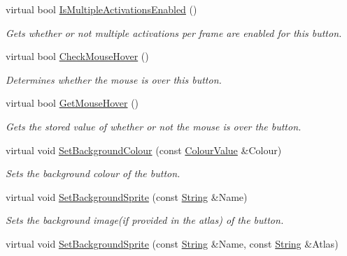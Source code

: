 \begin{DoxyCompactItemize}
virtual bool \hyperlink{classphys_1_1UI_1_1Button_a6630a0e94a3998f6972b35a4e368b3ff}{IsMultipleActivationsEnabled} ()
\begin{DoxyCompactList}\small\item\em Gets whether or not multiple activations per frame are enabled for this button. \item\end{DoxyCompactList}\item 
virtual bool \hyperlink{classphys_1_1UI_1_1Button_a72d76501d15053e3fbd9e7eb933e22de}{CheckMouseHover} ()
\begin{DoxyCompactList}\small\item\em Determines whether the mouse is over this button. \item\end{DoxyCompactList}\item 
virtual bool \hyperlink{classphys_1_1UI_1_1Button_a66522ebf5f3c75e96a6dfd99700a0f74}{GetMouseHover} ()
\begin{DoxyCompactList}\small\item\em Gets the stored value of whether or not the mouse is over the button. \item\end{DoxyCompactList}\item 
virtual void \hyperlink{classphys_1_1UI_1_1Button_a390aa5a409361507b5802141380bc1d3}{SetBackgroundColour} (const \hyperlink{classphys_1_1ColourValue}{ColourValue} \&Colour)
\begin{DoxyCompactList}\small\item\em Sets the background colour of the button. \item\end{DoxyCompactList}\item 
virtual void \hyperlink{classphys_1_1UI_1_1Button_a7cecb219a59fb55db6ac0070359bb23f}{SetBackgroundSprite} (const \hyperlink{namespacephys_aa03900411993de7fbfec4789bc1d392e}{String} \&Name)
\begin{DoxyCompactList}\small\item\em Sets the background image(if provided in the atlas) of the button. \item\end{DoxyCompactList}\item 
virtual void \hyperlink{classphys_1_1UI_1_1Button_a13899540adb0b039fec892f24a312686}{SetBackgroundSprite} (const \hyperlink{namespacephys_aa03900411993de7fbfec4789bc1d392e}{String} \&Name, const \hyperlink{namespacephys_aa03900411993de7fbfec4789bc1d392e}{String} \&Atlas)

\end{DoxyCompactItemize}
